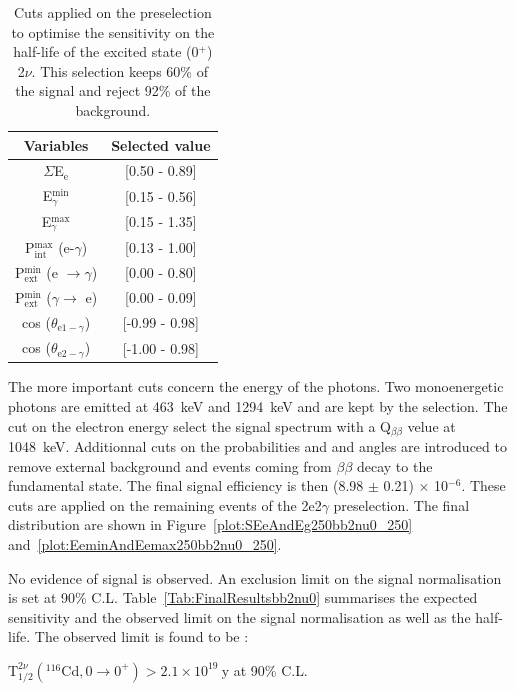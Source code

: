 \documentclass[main.tex]{subfiles}
\begin{document}
\begin{table}[h!]
\centering
\begin{tabular}{c|c}
Variables & Selected value \\
\toprule
$\Sigma$E$_{\text{e}}$ & [0.50 - 0.89] \\
E$_{\gamma}^{\text{min}}$    & [0.15 - 0.56] \\
E$_{\gamma}^{\text{max}}$    & [0.15 - 1.35] \\
P$_{\text{int}}^{\text{max}}$ (e-$\gamma$) & [0.13 - 1.00] \\
P$_{\text{ext}}^{\text{min}}$ (e $\rightarrow \gamma$) & [0.00 - 0.80] \\
P$_{\text{ext}}^{\text{min}}$ ($\gamma \rightarrow$ e) & [0.00 - 0.09] \\
cos ($\theta_{\text{e1}-\gamma}$) & [-0.99 - 0.98] \\
cos ($\theta_{\text{e2}-\gamma}$) & [-1.00 - 0.98] \\
\bottomrule
\end{tabular}
\caption{Cuts applied on the preselection to optimise the sensitivity on the half-life of the excited state (0$^+$) 2$\nu$. This selection keeps 60\% of the signal and reject 92\% of the background.}
\label{tab:Cuts2nu0Plus250keV}
\end{table}


\bigskip


\NI The more important cuts concern the energy of the photons. Two monoenergetic photons are emitted at 463~keV and 1294~keV and are kept by the selection. The cut on the electron energy select the signal spectrum with a Q$_{\beta\beta}$ velue at 1048~keV. Additionnal cuts on the probabilities and and angles are introduced to remove external background and events coming from $\beta\beta$ decay to the fundamental state. The final signal efficiency is then (8.98 $\pm$ 0.21) $\times$ 10$^{-\text{6}}$. These cuts are applied on the remaining events of the 2e2$\gamma$ preselection. The final distribution are shown in Figure~\ref{plot:SEeAndEg250bb2nu0_250} and~\ref{plot:EeminAndEemax250bb2nu0_250}. 


\bigskip


\NI No evidence of signal is observed. An exclusion limit on the signal normalisation is set at 90\% C.L. Table~\ref{Tab:FinalResultsbb2nu0} summarises the expected sensitivity and the observed limit on the signal normalisation as well as the half-life. The observed limit is found to be : 


\begin{center}
$ \text{T}_{\text{1/2}}^{\text{2}\nu} (^{\text{116}} \text{Cd}, \text{0} \rightarrow \text{0}^{+}) > \text{2.1} \times \text{10}^{\text{19}}~\text{y}$ at 90\% C.L.
\end{center}
\end{document}
